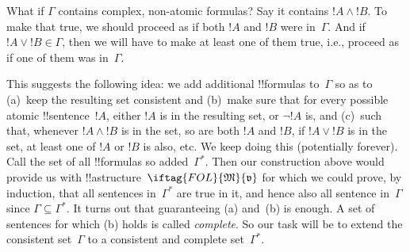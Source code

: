 \documentclass[../../../include/open-logic-section]{subfiles}
\begin{document}
What if $\Gamma$ contains complex, non-atomic formulas? Say it
contains $!A \land !B$. To make that true, we should proceed as if
both $!A$ and $!B$ were in~$\Gamma$.  And if $!A \lor !B \in \Gamma$,
then we will have to make at least one of them true, i.e., proceed as
if one of them was in~$\Gamma$.

This suggests the following idea: we add additional !!{formula}s
to~$\Gamma$ so as to (a)~keep the resulting set consistent and
(b)~make sure that for every possible atomic !!{sentence}~$!A$, either
$!A$ is in the resulting set, or $\lnot !A$ is, and (c)~such that,
whenever $!A \land !B$ is in the set, so are both $!A$ and $!B$, if
$!A \lor !B$ is in the set, at least one of $!A$ or $!B$ is also, etc.
We keep doing this (potentially forever).  Call the set of all
!!{formula}s so added~$\Gamma^*$.  Then our construction above would
provide us with !!a{structure}~$\iftag{FOL}{\Struct{M}}{\pAssign{v}}$
for which we could prove, by induction, that all sentences
in~$\Gamma^*$ are true in it, and hence also all sentence in~$\Gamma$
since $\Gamma \subseteq \Gamma^*$.  It turns out that guaranteeing (a)
and~(b) is enough. A set of sentences for which (b) holds is called
\emph{complete}. So our task will be to extend the consistent
set~$\Gamma$ to a consistent and complete set~$\Gamma^*$.
\end{document}
